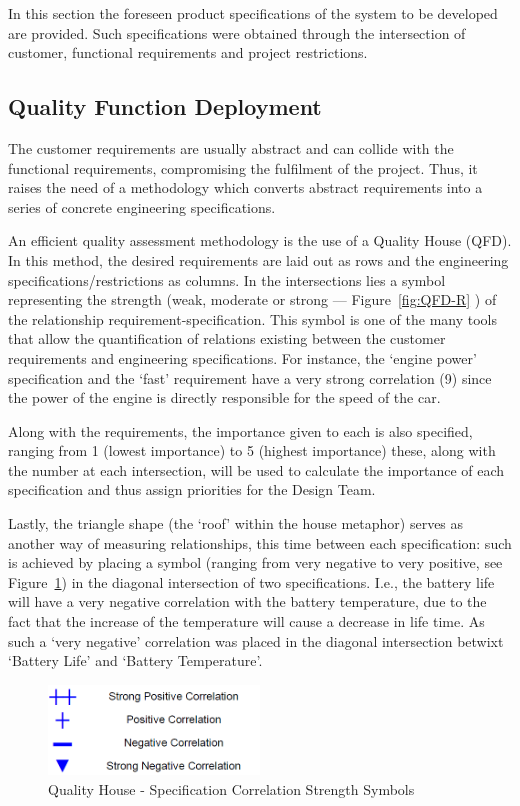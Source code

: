In this section the foreseen product specifications of the system to be developed are provided. Such specifications were obtained through the intersection of customer, functional requirements and project restrictions.
\subsection{Quality Function Deployment}%
\label{sec:qfd}
The customer requirements are usually abstract and can collide with the functional requirements, compromising the fulfilment of the project. Thus, it raises the need of a methodology which converts abstract requirements into a series of concrete engineering specifications.

An efficient quality assessment methodology is the use of a Quality House (QFD). In this method, the desired requirements are laid out as rows and the engineering specifications/restrictions as columns. In the intersections lies a symbol representing the strength (weak, moderate or strong --- Figure~\ref{fig:QFD-R} ) of the relationship requirement-specification. This symbol is one of the many tools that allow the quantification of relations existing between the customer requirements and engineering specifications.
For instance, the `engine power' specification and the `fast' requirement have a
very strong correlation (9) since the power of the engine is directly
responsible for the speed of the car.

Along with the requirements, the importance given to each is also specified, ranging from 1 (lowest importance) to 5 (highest importance) these, along with the number at each intersection, will be used to calculate the importance of each specification and thus assign priorities for the Design Team.

Lastly, the triangle shape (the `roof' within the house metaphor) serves as another way of measuring relationships, this time between each specification: such is achieved by placing a symbol (ranging from very negative to very positive, see Figure~\ref{fig:QFD-Roof}) in the diagonal intersection of two specifications. 
I.e., the battery life will have a very negative correlation with the battery temperature, due to the fact that the increase of the temperature will cause a decrease in life time. As such a `very negative' correlation was placed in the diagonal intersection betwixt `Battery Life' and `Battery Temperature'. 
\begin{figure}[!htbp]
   \centering
       \includegraphics[page=1,width=0.5\textwidth]{sec/img/Roof_Symbols.png} 
 \caption{Quality House - Specification Correlation Strength Symbols}%
\label{fig:QFD-Roof}
\end{figure}


